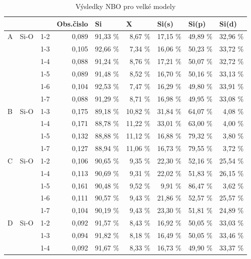 \documentclass[
  digital, %
  table,   %
  lof,     %
  lot,     %
  oneside,
]{fithesis3}
\begin{document}
\begin{table}[htbp]
\caption{Výsledky NBO pro velké modely}
\begin{center}
\begin{tabular}{|l|l|l|r|r|r|r|r|r|}
\hline
 &  &  & \multicolumn{1}{l|}{Obs.čislo} & \multicolumn{1}{l|}{Si} & \multicolumn{1}{l|}{X} & \multicolumn{1}{l|}{Si(s)} & \multicolumn{1}{l|}{Si(p)} & \multicolumn{1}{l|}{Si(d)} \\ \hline
A & Si-O & 1-2  & 0,089 & 91,33 \% & 8,67 \% & 17,15 \% & 49,89 \% & 32,96 \% \\ \hline
 &  & 1-3  & 0,105 & 92,66 \% & 7,34 \% & 16,06 \% & 50,23 \% & 33,72 \% \\ \hline
 &  & 1-4  & 0,088 & 91,24 \% & 8,76 \% & 17,21 \% & 50,07 \% & 32,72 \% \\ \hline
 &  & 1-5  & 0,089 & 91,48 \% & 8,52 \% & 16,70 \% & 50,16 \% & 33,13 \% \\ \hline
 &  & 1-6 & 0,104 & 92,53 \% & 7,47 \% & 16,29 \% & 49,80 \% & 33,91 \% \\ \hline
 &  & 1-7 & 0,088 & 91,29 \% & 8,71 \% & 16,98 \% & 49,95 \% & 33,08 \% \\ \hline
B & Si-O & 1-3  & 0,175 & 89,18 \% & 10,82 \% & 31,84 \% & 64,07 \% & 4,08 \% \\ \hline
 &  & 1-4  & 0,171 & 88,78 \% & 11,22 \% & 33,01 \% & 63,00 \% & 4,00 \% \\ \hline
 &  & 1-5  & 0,132 & 88,88 \% & 11,12 \% & 16,88 \% & 79,32 \% & 3,80 \% \\ \hline
 &  & 1-7 & 0,127 & 88,94 \% & 11,06 \% & 16,73 \% & 79,55 \% & 3,72 \% \\ \hline
C & Si-O & 1-2  & 0,106 & 90,65 \% & 9,35 \% & 22,30 \% & 52,16 \% & 25,54 \% \\ \hline
 &  & 1-4  & 0,113 & 90,69 \% & 9,31 \% & 22,02 \% & 51,83 \% & 26,15 \% \\ \hline
 &  & 1-5  & 0,161 & 90,48 \% & 9,52 \% & 9,91 \% & 86,47 \% & 3,62 \% \\ \hline
 &  & 1-6 & 0,111 & 90,57 \% & 9,43 \% & 21,86 \% & 52,57 \% & 25,57 \% \\ \hline
 &  & 1-7 & 0,104 & 90,19 \% & 9,43 \% & 23,30 \% & 51,81 \% & 24,89 \% \\ \hline
D & Si-O & 1-2  & 0,092 & 91,57 \% & 8,43 \% & 16,92 \% & 50,05 \% & 33,03 \% \\ \hline
 &  & 1-3  & 0,094 & 91,82 \% & 8,18 \% & 16,49 \% & 50,05 \% & 33,46 \% \\ \hline
 &  & 1-4  & 0,092 & 91,67 \% & 8,33 \% & 16,73 \% & 49,90 \% & 33,37 \% \\ \hline

\end{tabular}
\end{center}
\end{table}
\end{document}
